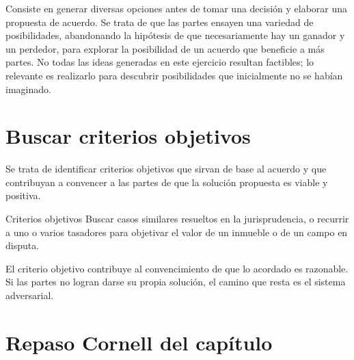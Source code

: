 \documentclass[12pt,oneside]{book}
\begin{document}
Consiste en generar diversas opciones antes de tomar una decisión y elaborar una propuesta de acuerdo. Se trata de que las partes ensayen una variedad de posibilidades, abandonando la hipótesis de que necesariamente hay un ganador y un perdedor, para explorar la posibilidad de un acuerdo que beneficie a más partes. No todas las ideas generadas en este ejercicio resultan factibles; lo relevante es realizarlo para descubrir posibilidades que inicialmente no se habían imaginado.

\section{Buscar criterios objetivos}

Se trata de identificar criterios objetivos que sirvan de base al acuerdo y que contribuyan a convencer a las partes de que la solución propuesta es viable y positiva.

\begin{example}{Criterios objetivos}
Buscar casos similares resueltos en la jurisprudencia, o recurrir a uno o varios tasadores para objetivar el valor de un inmueble o de un campo en disputa.
\end{example}

\begin{note}
El criterio objetivo contribuye al convencimiento de que lo acordado es razonable. Si las partes no logran darse su propia solución, el camino que resta es el sistema adversarial.
\end{note}

\section*{Repaso Cornell del capítulo}
\end{document}
